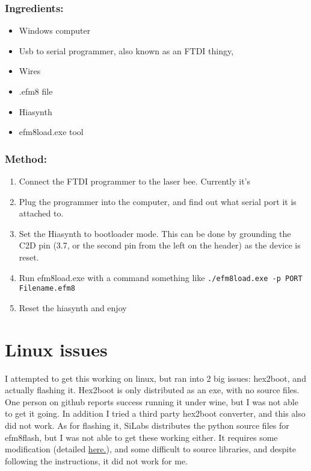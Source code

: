 \documentclass[a4paper]{article}
\begin{document}
\subsubsection{Ingredients:}
\begin{itemize}
	\item Windows computer
	\item Usb to serial programmer, also known as an FTDI thingy,
	\item Wires
	\item .efm8 file
	\item Hiasynth
	\item efm8load.exe tool
\end{itemize}

\subsubsection{Method:}
\begin{enumerate}
	\item Connect the FTDI programmer to the laser bee. Currently it's %
	\item Plug the programmer into the computer, and find out what serial port it is attached to. 
	\item Set the Hiasynth to bootloader mode. This can be done by grounding the C2D pin (3.7, or the second pin from the left on the header) as the device is reset. 
	\item Run efm8load.exe with a command something like \lstinline|./efm8load.exe -p PORT Filename.efm8|
	\item Reset the hiasynth and enjoy
\end{enumerate}

\section{Linux issues}

I attempted to get this working on linux, but ran into 2 big issues: hex2boot, and actually flashing it. Hex2boot is only distributed as an exe, with no source files. One person on github reports success running it under wine, but I was not able to get it going. In addition I tried a third party hex2boot converter, and this also did not work. As for flashing it, SiLabs distributes the python source files for efm8flash, but I was not able to get these working either. It requires some modification (detailed \href{https://community.silabs.com/s/article/how-to-use-efm8-uart-bootloader-on-linux?language=en_US}{here.}), and some difficult to source libraries, and despite following the instructions, it did not work for me.
\end{document}

